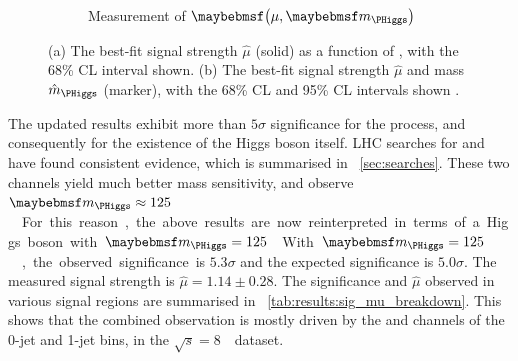 \begin{figure}[t]
\begin{subfigure}[b]{0.495\textwidth}
		\caption{Measurement of $\parenths{\mu, \mH}$}
		\label{fig:results:mu_mH}
	\end{subfigure}
	\caption{(a) The best-fit signal strength $\hat{\mu}$ (solid) as a function of \mH, with 
	the 68\% CL interval shown. (b) The best-fit signal strength $\hat{\mu}$ and mass 
	$\hat{m}_{\PHiggs}$ (marker), with the 68\% CL and 95\% CL intervals shown 
	\cite{HWW-Moriond}.}
\end{figure}

The updated results exhibit more than $5\sigma$ significance for the \ggHWWlvlv process, and 
consequently for the existence of the Higgs boson itself. LHC searches for 
\HepProcess{\PHiggs \HepTo \Pphoton\Pphoton} and \HepProcess{\PHiggs \HepTo \PZ\PZ} have 
found consistent evidence, which is summarised in \Section~\ref{sec:searches}. These two 
channels yield much better mass sensitivity, and observe \unit{$\mH \approx 125$}{\GeV}. 
For this reason, the above results are now reinterpreted in terms of a Higgs boson with 
\unit{$\mH = 125$}{\GeV}.

With \unit{$\mH = 125$}{\GeV}, the observed significance is $5.3\sigma$ and the expected 
significance is $5.0\sigma$. The measured signal strength is $\hat{\mu} = 1.14 \pm 0.28$. 
The significance and $\hat{\mu}$ observed in various signal regions are summarised in 
\Table~\ref{tab:results:sig_mu_breakdown}. This shows that the combined observation is 
mostly driven by the \emch and \mech channels of the 0-jet and 1-jet bins, in the 
\unit{$\sqrt{s} = 8$}{\TeV} dataset.

